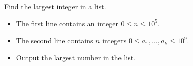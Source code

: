 \problemname{\problemyamlname}


\newcommand{\maxn}{10^5}
\newcommand{\maxa}{10^9}

Find the largest integer in a list.

\begin{Input}
	\begin{itemize}
		\item The first line contains an integer $0 \leq n \leq \maxn$.
		\item The second line contains $n$ integers $0\leq a_1, \dots, a_k\leq \maxa$.	
	\end{itemize}
\end{Input}

\begin{Output}
	\begin{itemize}
		\item Output the largest number in the list.
	\end{itemize}
\end{Output}
